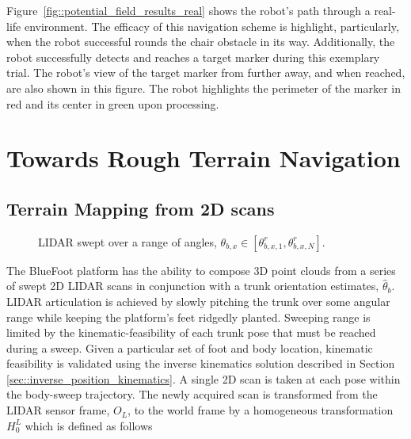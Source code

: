 			Figure~\ref{fig::potential_field_results_real} shows the robot's path through a real-life environment. The efficacy of this navigation scheme is highlight, particularly, when the robot successful rounds the chair obstacle in its way. Additionally, the robot successfully detects and reaches a target marker during this exemplary trial. The robot's view of the target marker from further away, and when reached, are also shown in this figure. The robot highlights the  perimeter of the marker in red and its center in green upon processing.


	\section{Towards Rough Terrain Navigation}


		\subsection{Terrain Mapping from 2D scans}
			\label{ssec::terrain_mapping}
			\begin{figure}[!h]
				\centering
				\caption{LIDAR swept over a range of angles, $\theta_{b,x} \in [\theta_{b,x,1}^{r},\theta_{b,x,N}^{r}]$. }
				\label{fig::sensor_sweep}
			\end{figure}
			The BlueFoot platform has the ability to compose 3D point clouds from a series of swept 2D LIDAR scans in conjunction with a trunk orientation estimates, $\hat{\theta}_{b}$. LIDAR articulation is achieved by slowly pitching the trunk over some angular range while keeping the platform's feet ridgedly planted. Sweeping range is limited by the kinematic-feasibility of each trunk pose that must be reached during a sweep. Given a particular set of foot and body location, kinematic feasibility is validated using the inverse kinematics solution described in Section \ref{sec::inverse_position_kinematics}. A single 2D scan is taken at each pose within the body-sweep trajectory. The newly acquired scan is transformed from the LIDAR sensor frame, $O_{L}$, to the world frame by a homogeneous transformation $H^{L}_{0}$ which is defined as follows
